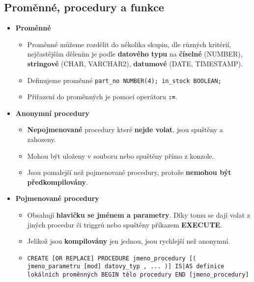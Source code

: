 \subsection{Proměnné, procedury a funkce}
\begin{itemize}
    \item \textbf{Proměnné}
          \begin{itemize}
              \item Proměnné můžeme rozdělit do několika skupin, dle různých kritérií, nejčastějším dělením je podle \textbf{datového typu} na \textbf{číselné} (NUMBER), \textbf{stringové} (CHAR, VARCHAR2), \textbf{datumové} (DATE, TIMESTAMP).
              \item Definujeme proměnné \texttt{part\_no NUMBER(4); in\_stock BOOLEAN;}
              \item Přiřazení do proměnných je pomocí operátoru \textbf{\texttt{:=}}.
          \end{itemize}

    \item \textbf{Anonymní procedury}
          \begin{itemize}
              \item \textbf{Nepojmenované} procedury které \textbf{nejde volat}, jsou spuštěny a zahozeny.
              \item Mohou být uloženy v souboru nebo spuštěny přímo z konzole.
              \item Jsou pomalejší než pojmenované procedury, protože \textbf{nemohou být předkompilovány}.
          \end{itemize}

    \item \textbf{Pojmenované procedury}
          \begin{itemize}
              \item Obsahují \textbf{hlavičku se jménem a parametry}. Díky tomu se dají volat z jiných procedur či triggrů nebo spuštěny příkazem \textbf{EXECUTE}.
              \item Jelikož jsou \textbf{kompilovány} jen jednou, jsou rychlejší než anonymní.
              \item \texttt{CREATE [OR REPLACE] PROCEDURE jmeno\_procedury [( jmeno\_parametru [mod] datovy\_typ , ... )] IS|AS definice lokálních proměnných BEGIN tělo procedury END [jmeno\_procedury]}
          \end{itemize}


\end{itemize}

